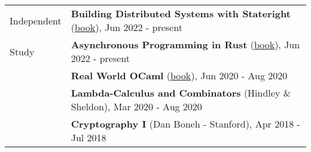\documentclass[letterpaper,10pt,oneside]{article}
\begin{document}
\vfill


\noindent \begin{tabular}{@{} l l}
 \Large{Independent} & \textbf{Building Distributed Systems with Stateright} (\href{https://www.stateright.rs/title-page.html}{book}), Jun 2022 - present \\
 \Large{Study} & \textbf{Asynchronous Programming in Rust} (\href{https://github.com/rust-lang/async-book}{book}), Jun 2022 - present \\
 \hspace{1.1in}  & \textbf{Real World OCaml} (\href{https://dev.realworldocaml.org/index.html}{book}), Jun 2020 - Aug 2020 \\
 & \textbf{Lambda-Calculus and Combinators} (Hindley \& Sheldon), Mar 2020 - Aug 2020 \\
 & \textbf{Cryptography I} (Dan Boneh - Stanford), Apr 2018 - Jul 2018 \\
\end{tabular}
\end{document}
